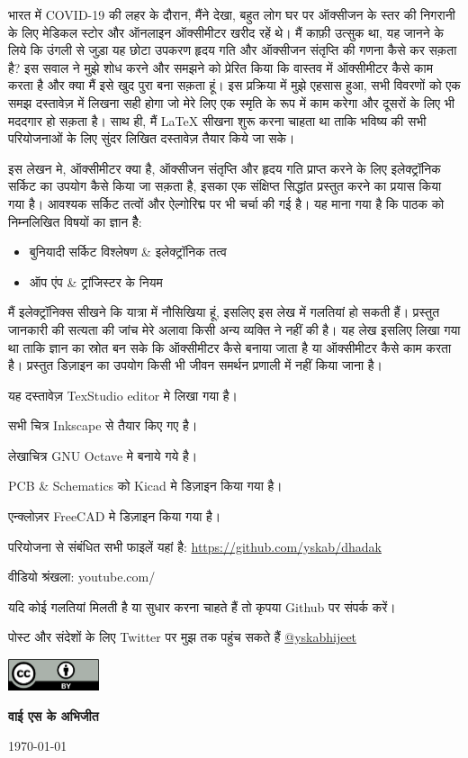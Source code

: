 भारत में COVID-19 की लहर के दौरान, मैंने देखा, बहुत लोग घर पर ऑक्सीजन के स्तर की निगरानी के लिए मेडिकल स्टोर और ऑनलाइन ऑक्सीमीटर खरीद रहें थे। मैं काफ़ी उत्सुक था, यह जानने के लिये कि उंगली से जुड़ा यह छोटा उपकरण हृदय गति और ऑक्सीजन संतृप्ति की गणना कैसे कर सक़ता है? इस सवाल ने मुझे शोध करने और समझने को प्रेरित किया कि वास्तव में ऑक्सीमीटर कैसे काम करता है और क्या मैं इसे खुद पुरा बना सक़ता हूं। इस प्रक्रिया में मुझे एहसास हुआ, सभी विवरणों को एक समझ दस्तावेज़ में लिखना सही होगा जो मेरे लिए एक स्मृति के रूप में काम करेगा और दूसरों के लिए भी मददगार हो सक़ता है।
साथ ही, मैं \LaTeX \hspace{1pt} सीखना शुरू करना चाहता था ताकि भविष्य की सभी परियोजनाओं के लिए सुंदर लिखित दस्तावेज़ तैयार किये जा सके।\bigskip

इस लेखन मे, ऑक्सीमीटर क्या है, ऑक्सीजन संतृप्ति और हृदय गति प्राप्त करने के लिए इलेक्ट्रॉनिक सर्किट का उपयोग कैसे किया जा सक़ता है, इसका एक संक्षिप्त सिद्धांत प्रस्तुत करने का प्रयास किया गया है। आवश्यक सर्किट तत्वों और ऐल्गोरिद्म पर भी चर्चा की गई है। यह माना गया है कि पाठक को निम्नलिखित विषयों का ज्ञान हैै:

\begin{itemize}
	\item बुनियादी सर्किट विश्लेषण \& इलेक्ट्रॉनिक तत्व
	\item ऑप एंप \& ट्रांजिस्टर के नियम
\end{itemize}

\bigskip

मैं इलेक्ट्रॉनिक्स सीखने कि यात्रा में नौसिखिया हूं, इसलिए इस लेख में गलतियां हो सकती हैं। प्रस्तुत जानकारी की सत्यता की जांच मेरे अलावा किसी अन्य व्यक्ति ने नहीं की है।
यह लेख इसलिए लिखा गया था ताकि ज्ञान का स्रोत बन सके कि ऑक्सीमीटर कैसे बनाया जाता है या ऑक्सीमीटर कैसे काम करता है। प्रस्तुत डिज़ाइन का उपयोग किसी भी जीवन समर्थन प्रणाली में नहीं किया जाना है।

\bigskip
यह दस्तावेज़ TexStudio editor मे लिखा गया है।	

सभी चित्र Inkscape से तैयार किए गए है।

लेखाचित्र GNU Octave मे बनाये गये है।

PCB \& Schematics को Kicad मे डिज़ाइन किया गया है।

एन्क्लोज़र FreeCAD मे डिज़ाइन किया गया है।

\medskip
परियोजना से संबंधित सभी फाइलें यहां है: \url{https://github.com/yskab/dhadak}

वीडियो श्रंखला: youtube.com/

\medskip
यदि कोई गलतियां मिलती है या सुधार करना चाहते हैं तो कृपया Github पर संपर्क करें। 

\medskip
पोस्ट और संदेशों के लिए Twitter पर मुझ तक पहुंच सकते हैं 
\href{https://twitter.com/yskabhijeet}{@yskabhijeet}

\includegraphics[width=0.2\textwidth]{../common/cc.png}\par

\vfill
\hfill
{\Large\bfseries वाई एस के अभिजीत}\par
\hfill
\large \today